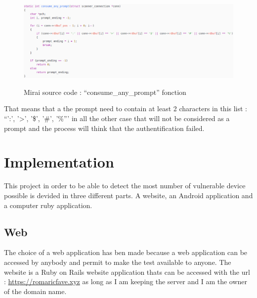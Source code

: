 \documentclass{report}
\begin{document}
\begin{figure}
  \caption{Mirai source code : ``consume\_any\_prompt'' fonction}
 \centering
 \includegraphics[width=1.2\textwidth]{./img/mirai-prompt}
 \label{fig:mirai-prompt}
\end{figure}
That means that a the prompt need to contain at least 2 characters in this list : ``':', '>', '\$', '\#', '\%''' in all the other case that will not be considered as a prompt and the process will think that the authentification failed.

\section{Implementation}
This project in order to be able to detect the most number of vulnerable device possible is devided in three different parts. A website, an Android application and a computer ruby application.
\subsection{Web}
The choice of a web application has ben made because a web application can be accessed by anybody and permit to make the test available to anyone. The website is a Ruby on Rails website application thats can be accessed with the url : \url{https://romaricfave.xyz} as long as I am keeping the server and I am the owner of the domain name.\newline
\end{document}
